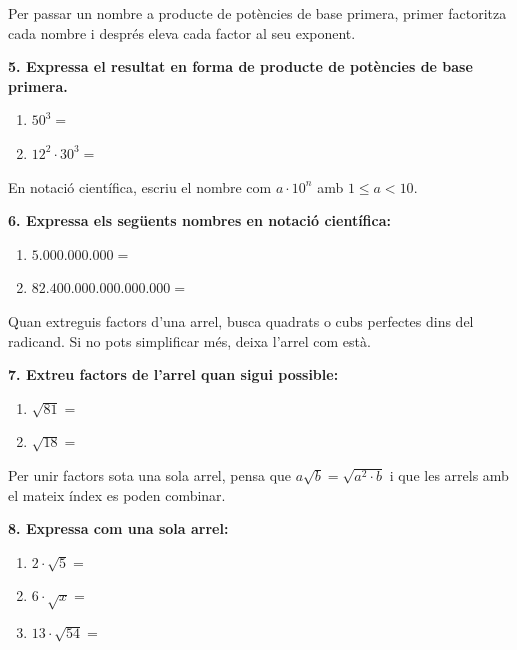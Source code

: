 \documentclass[12pt,a4paper]{article}
\begin{document}
\begin{capsula}
Per passar un nombre a producte de potències de base primera, primer factoritza cada nombre i després eleva cada factor al seu exponent.
\end{capsula}

\textbf{5. Expressa el resultat en forma de producte de potències de base primera.}
\begin{enumerate}[label=\alph*)]
    \item $50^3 =$ \vspace{0.8cm}
    \item $12^2\cdot 30^3 =$ \vspace{1cm}
\end{enumerate}

\begin{capsula}
En notació científica, escriu el nombre com $a\cdot 10^n$ amb $1\le a<10$.
\end{capsula}

\textbf{6. Expressa els següents nombres en notació científica:}
\begin{enumerate}[label=\alph*)]
    \item $5.000.000.000 =$ \vspace{0.8cm}
    \item $82.400.000.000.000.000 =$ \vspace{0.8cm}
\end{enumerate}

\begin{capsula}
Quan extreguis factors d'una arrel, busca quadrats o cubs perfectes dins del radicand. Si no pots simplificar més, deixa l'arrel com està.
\end{capsula}

\textbf{7. Extreu factors de l’arrel quan sigui possible:}
\begin{enumerate}[label=\alph*)]
    \item $\sqrt{81} =$ \vspace{0.8cm}
    \item $\sqrt{18} =$ \vspace{0.8cm}
\end{enumerate}

\begin{capsula}
Per unir factors sota una sola arrel, pensa que $a\sqrt{b}=\sqrt{a^2\cdot b}$ i que les arrels amb el mateix índex es poden combinar.
\end{capsula}

\textbf{8. Expressa com una sola arrel:}
\begin{enumerate}[label=\alph*)]
    \item $2\cdot \sqrt{5} =$ \vspace{0.8cm}
    \item $6\cdot \sqrt{x} =$ \vspace{0.8cm}
    \item $13\cdot \sqrt{54} =$ \vspace{0.8cm}
\end{enumerate}
\end{document}
